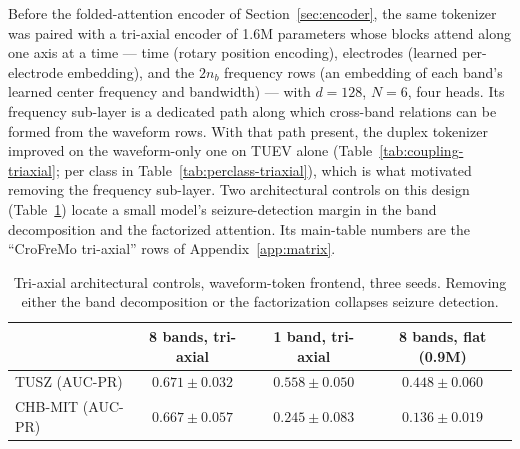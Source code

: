 Before the folded-attention encoder of Section~\ref{sec:encoder}, the
same tokenizer was paired with a tri-axial encoder of 1.6M parameters
whose blocks attend along one axis at a time --- time (rotary position
encoding), electrodes (learned per-electrode embedding), and the $2n_b$
frequency rows (an embedding of each band's learned center frequency and
bandwidth) --- with $d{=}128$, $N{=}6$, four heads. Its frequency
sub-layer is a dedicated path along which cross-band relations can be
formed from the waveform rows. With that path present, the duplex
tokenizer improved on the waveform-only one on TUEV alone
(Table~\ref{tab:coupling-triaxial}; per class in
Table~\ref{tab:perclass-triaxial}), which is what motivated removing the
frequency sub-layer. Two architectural controls on this design
(Table~\ref{tab:arch}) locate a small model's seizure-detection margin in
the band decomposition and the factorized attention. Its main-table
numbers are the ``CroFreMo tri-axial'' rows of Appendix~\ref{app:matrix}.
\begin{table}[h]
\centering
\small
\caption{Tri-axial architectural controls, waveform-token frontend, three
seeds. Removing either the band decomposition or the factorization
collapses seizure detection.}
\label{tab:arch}
\begin{tabular}{lccc}
\toprule
 & 8 bands, tri-axial & 1 band, tri-axial & 8 bands, flat (0.9M) \\
\midrule
TUSZ (AUC-PR) & $0.671 \pm 0.032$ & $0.558 \pm 0.050$ & $0.448 \pm 0.060$ \\
CHB-MIT (AUC-PR) & $0.667 \pm 0.057$ & $0.245 \pm 0.083$ & $0.136 \pm 0.019$ \\
\bottomrule
\end{tabular}
\end{table}


